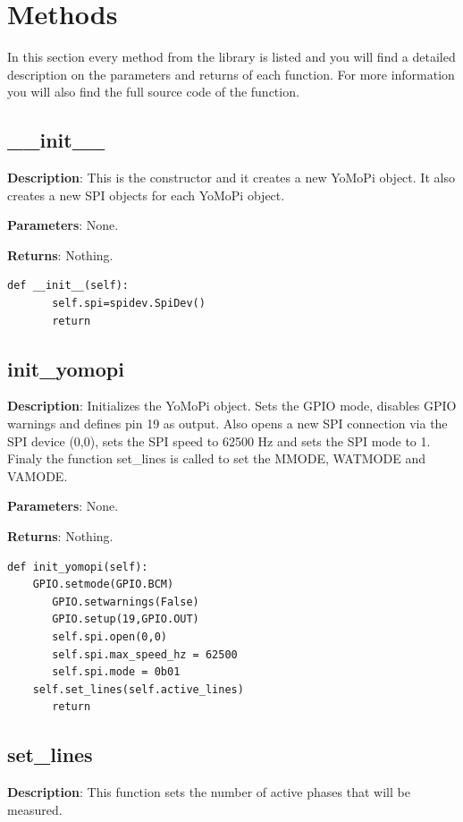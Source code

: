 \documentclass{scrartcl}  %
\begin{document}
\section{Methods}

In this section every method from the library is listed and you will find a detailed description on the parameters and returns of each function. For more information you will also find the full source code of the function.
\subsection{__init__}


\textbf{Description}: This is the constructor and it creates a new YoMoPi object. It also creates a new SPI objects for each YoMoPi object.

\textbf{Parameters}: None.

\textbf{Returns}: Nothing.
\begin{lstlisting}
def __init__(self):
       self.spi=spidev.SpiDev()
       return 
\end{lstlisting}
 
\subsection{init_yomopi}

\textbf{Description}: Initializes the YoMoPi object. Sets the GPIO mode, disables GPIO warnings and defines pin 19 as output. Also opens a new SPI connection via the SPI device (0,0), sets the SPI speed to 62500 Hz and sets the SPI mode to 1. Finaly the function set_lines is called to set the MMODE, WATMODE and VAMODE.

\textbf{Parameters}: None.

\textbf{Returns}: Nothing.

\begin{lstlisting}
def init_yomopi(self):
	GPIO.setmode(GPIO.BCM)
       GPIO.setwarnings(False)
       GPIO.setup(19,GPIO.OUT)
       self.spi.open(0,0)
       self.spi.max_speed_hz = 62500
       self.spi.mode = 0b01
	self.set_lines(self.active_lines)
       return 
\end{lstlisting}
		
\subsection{set_lines}

\textbf{Description}: This function sets the number of active phases that will be measured.
\end{document}

